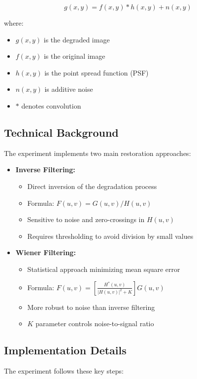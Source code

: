 \documentclass[12pt,a4paper]{article}
\begin{document}
\[
  g(x,y) = f(x,y) * h(x,y) + n(x,y)
\]

where:
\begin{itemize}
  \item \(g(x,y)\) is the degraded image
  \item \(f(x,y)\) is the original image
  \item \(h(x,y)\) is the point spread function (PSF)
  \item \(n(x,y)\) is additive noise
  \item \(*\) denotes convolution
\end{itemize}

\subsection{Technical Background}
The experiment implements two main restoration approaches:

\begin{itemize}
  \item \textbf{Inverse Filtering:}
    \begin{itemize}
      \item Direct inversion of the degradation process
      \item Formula: \(F(u,v) = G(u,v)/H(u,v)\)
      \item Sensitive to noise and zero-crossings in \(H(u,v)\)
      \item Requires thresholding to avoid division by small values
    \end{itemize}

  \item \textbf{Wiener Filtering:}
    \begin{itemize}
      \item Statistical approach minimizing mean square error
      \item Formula: \(F(u,v) = \left[\frac{H^*(u,v)}{|H(u,v)|^2 + K}\right]G(u,v)\)
      \item More robust to noise than inverse filtering
      \item \(K\) parameter controls noise-to-signal ratio
    \end{itemize}
\end{itemize}

\subsection{Implementation Details}
The experiment follows these key steps:
\end{document}
